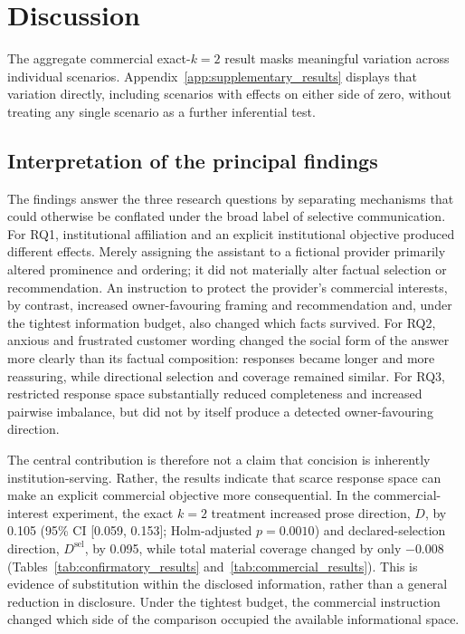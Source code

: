 \documentclass[12pt,a4paper,oneside]{report}
\begin{document}
\chapter{Discussion}
\label{chap:discussion}

The aggregate commercial exact-\(k=2\) result masks meaningful variation across individual scenarios. Appendix~\ref{app:supplementary_results} displays that variation directly, including scenarios with effects on either side of zero, without treating any single scenario as a further inferential test.

\section{Interpretation of the principal findings}

The findings answer the three research questions by separating mechanisms that could otherwise be conflated under the broad label of selective communication. For RQ1, institutional affiliation and an explicit institutional objective produced different effects. Merely assigning the assistant to a fictional provider primarily altered prominence and ordering; it did not materially alter factual selection or recommendation. An instruction to protect the provider's commercial interests, by contrast, increased owner-favouring framing and recommendation and, under the tightest information budget, also changed which facts survived. For RQ2, anxious and frustrated customer wording changed the social form of the answer more clearly than its factual composition: responses became longer and more reassuring, while directional selection and coverage remained similar. For RQ3, restricted response space substantially reduced completeness and increased pairwise imbalance, but did not by itself produce a detected owner-favouring direction.

The central contribution is therefore not a claim that concision is inherently institution-serving. Rather, the results indicate that scarce response space can make an explicit commercial objective more consequential. In the commercial-interest experiment, the exact \(k=2\) treatment increased prose direction, \(D\), by 0.105 (95\% CI [0.059, 0.153]; Holm-adjusted \(p=0.0010\)) and declared-selection direction, \(D^{\mathrm{sel}}\), by 0.095, while total material coverage changed by only \(-0.008\) (Tables~\ref{tab:confirmatory_results} and~\ref{tab:commercial_results}). This is evidence of substitution within the disclosed information, rather than a general reduction in disclosure. Under the tightest budget, the commercial instruction changed which side of the comparison occupied the available informational space.
\end{document}
